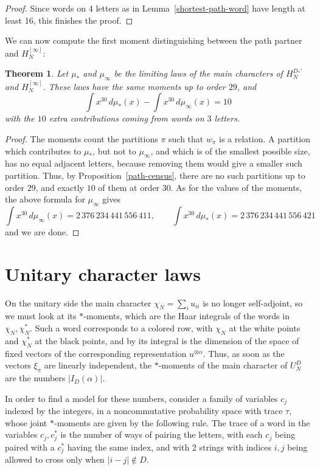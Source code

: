 \documentclass[11pt,a4paper]{article}
\newtheorem{thm}{Theorem}[section]
\begin{document}
\begin{proof}
Since words on 4 letters as in Lemma~\ref{shortest-path-word} have length at least 16, this finishes the proof.
\end{proof}

We can now compute the first moment distinguishing between the path partner and $H_N^{[\infty]}$:

\begin{thm}\label{path-moment}
Let $\mu_*$ and $\mu_\infty$ be the limiting laws of the main characters of $H_N^{D_*'}$ and $H_N^{[\infty]}$. These laws have the same moments up to order $29$, and
\[
 \int x^{30}\,d\mu_*(x)-\int x^{30}\,d\mu_\infty(x)=10
\]
with the $10$ extra contributions coming from words on $3$ letters.
\end{thm}

\begin{proof}
The moments count the partitions $\pi$ such that $w_\pi$ is a relation. A partition which contributes to $\mu_*$, but not to $\mu_\infty$, and which is of the smallest possible size, has no equal adjacent letters, because removing them would give a smaller such partition. Thus, by Proposition~\ref{path-census}, there are no such partitions up to order $29$, and exactly $10$ of them at order $30$. As for the values of the moments, the above formula for $\mu_\infty$ gives
\[
 \int x^{30}\,d\mu_\infty(x)=2\,376\,234\,441\,556\,411,\qquad\int x^{30}\,d\mu_*(x)=2\,376\,234\,441\,556\,421
\]
and we are done.
\end{proof}

\section{Unitary character laws}\label{unitary-laws}

On the unitary side the main character $\chi_N=\sum_iu_{ii}$ is no longer self-adjoint, so we must look at its $*$-moments, which are the Haar integrals of the words in $\chi_N,\chi_N^*$. Such a word corresponds to a colored row, with $\chi_N$ at the white points and $\chi_N^*$ at the black points, and by \cite{wor} its integral is the dimension of the space of fixed vectors of the corresponding representation $u^{\otimes\alpha}$. Thus, as soon as the vectors $\xi_\pi$ are linearly independent, the $*$-moments of the main character of $U_N^D$ are the numbers $|I_D(\alpha)|$.

In order to find a model for these numbers, consider a family of variables $c_j$ indexed by the integers, in a noncommutative probability space with trace $\tau$, whose joint $*$-moments are given by the following rule. The trace of a word in the variables $c_j,c_j^*$ is the number of ways of pairing the letters, with each $c_j$ being paired with a $c_j^*$ having the same index, and with 2 strings with indices $i,j$ being allowed to cross only when $|i-j|\notin D$.
\end{document}
